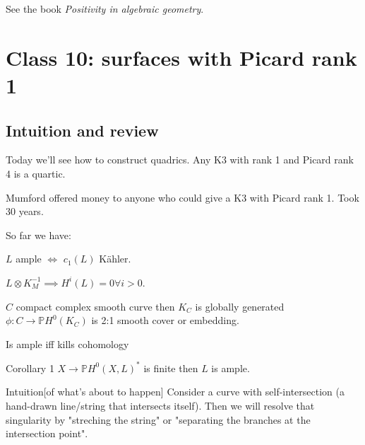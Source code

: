 \begin{remark}
	See the book \textit{Positivity in algebraic geometry}.
\end{remark}




\section{Class 10: surfaces with Picard rank 1}

\subsection{Intuition and review}

Today we'll see how to construct quadrics. Any K3 with rank 1 and Picard rank 4 is a quartic.

\begin{thing4}{Mumford}\leavevmode
	offered money to anyone who could give a K3 with Picard rank 1. Took 30 years.
\end{thing4}

So far we have:

\begin{thm}[Kodaira]\leavevmode
	$L$ ample $\iff$ $c_1(L)$ Kähler.
\end{thm}

\begin{thm}\leavevmode
	$L\otimes K^{-1}_M\implies H^{i}(L)=0\forall i>0$.
\end{thm}

\begin{thm}[?]\leavevmode
	$C$ compact complex smooth curve then $K_C$ is globally generated  $\phi:C\longrightarrow \mathbb{P}H^{0}(K_C)$ is 2:1 smooth cover or embedding.
\end{thm}

\begin{thm}\leavevmode
	Is ample iff kills cohomology
\end{thm}

\begin{thing2}{Corollary 1}\leavevmode
	$X\longrightarrow \mathbb{P}H^{0}(X,L)^*$ is finite then $L$ is ample.
\end{thing2}

\begin{thing5}{Intuition}[of what's about to happen]\leavevmode
	Consider a curve with self-intersection (a hand-drawn line/string that intersects itself). Then we will resolve that singularity by "streching the string" or "separating the branches at the intersection point".
\end{thing5}

